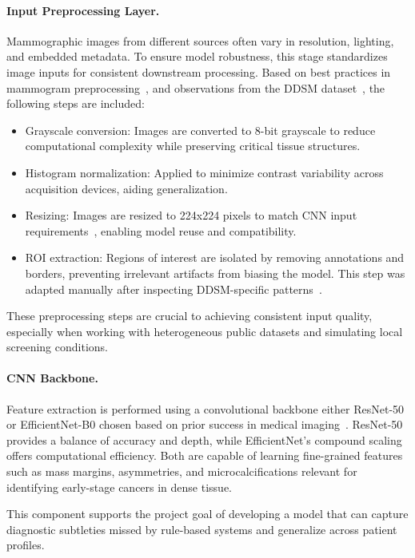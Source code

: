 \documentclass[12pt]{article}
\begin{document}
\paragraph{Input Preprocessing Layer.}

Mammographic images from different sources often vary in resolution, lighting, and embedded metadata. To ensure model robustness, this stage standardizes image inputs for consistent downstream processing. Based on best practices in mammogram preprocessing~\cite{7,14}, and observations from the DDSM dataset~\cite{17}, the following steps are included:

\begin{itemize}
    \item {Grayscale conversion:} Images are converted to 8-bit grayscale to reduce computational complexity while preserving critical tissue structures.
    \item {Histogram normalization:} Applied to minimize contrast variability across acquisition devices, aiding generalization.
    \item {Resizing:} Images are resized to 224x224 pixels to match CNN input requirements~\cite{1}, enabling model reuse and compatibility.
    \item {ROI extraction:} Regions of interest are isolated by removing annotations and borders, preventing irrelevant artifacts from biasing the model. This step was adapted manually after inspecting DDSM-specific patterns~\cite{17}.
\end{itemize}

These preprocessing steps are crucial to achieving consistent input quality, especially when working with heterogeneous public datasets and simulating local screening conditions.

\paragraph{CNN Backbone.}
Feature extraction is performed using a convolutional backbone either ResNet-50 or EfficientNet-B0 chosen based on prior success in medical imaging~\cite{1,7}. ResNet-50 provides a balance of accuracy and depth, while EfficientNet’s compound scaling offers computational efficiency. Both are capable of learning fine-grained features such as mass margins, asymmetries, and microcalcifications relevant for identifying early-stage cancers in dense tissue.

This component supports the project goal of developing a model that can capture diagnostic subtleties missed by rule-based systems and generalize across patient profiles.
\end{document}

